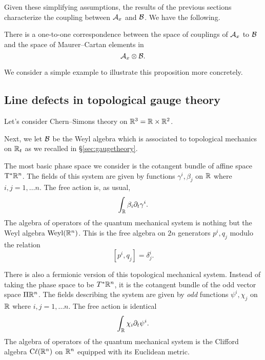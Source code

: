 \documentclass[11pt]{amsart}
\begin{document}
Given these simplifying assumptions, the results of the previous sections characterize the coupling between $\mathcal A_x$ and $\mathcal B$.
We have the following.

\begin{prop}\label{prop:line}
There is a one-to-one correspondence between the space of couplings of $\mathcal A_x$ to $\mathcal B$ and the space of Maurer--Cartan elements in 
\[
\mathcal A_x \otimes \mathcal B .
\]
\end{prop}

We consider a simple example to illustrate this proposition more concretely. 

\subsection{Line defects in topological gauge theory}

Let's consider Chern--Simons theory on $\mathbb R^3 = \mathbb R \times \mathbb R^2$. 



Next, we let $\mathcal B$ be the Weyl algebra which is associated to topological mechanics on $\mathbb R_t$ as we recalled in \S \ref{sec:gaugetheory}. 

The most basic phase space we consider is the cotangent bundle of affine space ${\rm T}^* \mathbb R^n$.
The fields of this system are given by functions $\gamma^i, \beta_j$ on $\mathbb R$ where $i,j=1,\ldots n$. 
The free action is, as usual,
\[
\int_\mathbb R \beta_i \partial_t \gamma^i .
\]
The algebra of operators of the quantum mechanical system is nothing but the Weyl algebra ${\rm Weyl}(\mathbb R^n)$.
This is the free algebra on $2n$ generators $p^i, q_j$ modulo the relation
\[
[p^i, q_j] = \delta^i_j .
\]

There is also a fermionic version of this topological mechanical system. 
Instead of taking the phase space to be $T^* \mathbb R^n$, it is the cotangent bundle of the odd vector space $\Pi \mathbb R^n$.
The fields describing the system are given by {\em odd} functions $\psi^i, \chi_j$ on $\mathbb R$ where $i,j=1,\ldots n$. 
The free action is identical
\[
\int_\mathbb R \chi_i \partial_t \psi^i .
\]
The algebra of operators of the quantum mechanical system is the Clifford algebra ${\rm C}\ell(\mathbb R^n)$ on $\mathbb R^n$ equipped with its Euclidean metric. 
\end{document}
